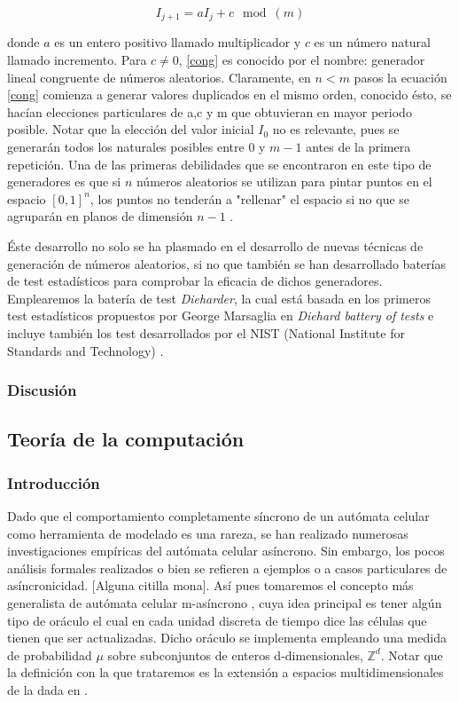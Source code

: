 \documentclass[../proyecto.tex]{memoir}
\begin{document}
\begin{equation} \label{cong}
I_{j+1} = aI_{j} +c \mod (m)
\end{equation}

donde $a$ es un entero positivo llamado multiplicador y $c$ es un número natural llamado incremento. Para $c \neq 0$, \ref{cong} es conocido por el nombre: generador lineal congruente de números aleatorios. Claramente, en $n<m$ pasos la ecuación \ref{cong} comienza a generar valores duplicados en el mismo orden, conocido ésto, se hacían elecciones particulares de a,c y m que obtuvieran en mayor periodo posible. Notar que la elección del valor inicial $I_{0}$ no es relevante, pues se generarán todos los naturales posibles entre $0$ y $m-1$ antes de la primera repetición. Una de las primeras debilidades que se encontraron en este tipo de generadores es que si $n$ números aleatorios se utilizan para pintar puntos en el espacio $[0,1]^{n}$, los puntos no tenderán a "rellenar" el espacio si no que se agruparán en planos de dimensión $n-1$ \cite{planos}. 

Éste desarrollo no solo se ha plasmado en el desarrollo de nuevas técnicas de generación de números aleatorios, si no que también se han desarrollado baterías de test estadísticos para comprobar la eficacia de dichos generadores. Emplearemos la batería de test \textit{Dieharder}, la cual está basada en los primeros test estadísticos propuestos por George Marsaglia en \textit{Diehard battery of tests} e incluye también los test desarrollados por el NIST (National Institute for Standards and Technology) \cite{dieharder}.

\subsubsection{Discusión}



\subsection{Teoría de la computación}

\subsubsection{Introducción}
Dado que el comportamiento completamente síncrono de un autómata celular como herramienta de modelado es una rareza, se han realizado numerosas investigaciones empíricas del autómata celular asíncrono. Sin embargo, los pocos análisis formales realizados o bien se refieren a ejemplos o a casos particulares de asíncronicidad. [Alguna citilla mona]. Así pues tomaremos el concepto más generalista de autómata celular m-asíncrono \cite{oraculo}, cuya idea principal es tener algún tipo de oráculo el cual en cada unidad discreta de tiempo dice las células que tienen que ser actualizadas. Dicho oráculo se implementa empleando una medida de probabilidad $\mu$ sobre subconjuntos de enteros d-dimensionales, $\mathds{Z}^{d}$. Notar que la definición con la que trataremos es la extensión a espacios multidimensionales de la dada en \cite{oraculo}.
\end{document}
